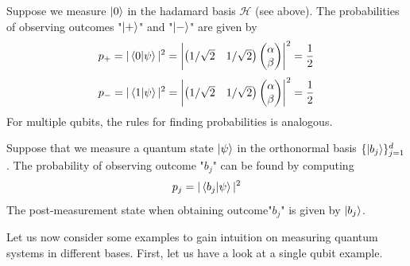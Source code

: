 \begin{example}
    Suppose we measure $\ket{0}$ in the hadamard basis $\mathcal{H}$ (see above). The probabilities of observing outcomes "$\ket{+}$" and "$\ket{-}$" are given by
    \[
    p_+=|\braket{0|\psi}|^2=\begin{vmatrix}\begin{pmatrix} 1/\sqrt{2} & 1/\sqrt{2} \end{pmatrix} \begin{pmatrix}\alpha \\ \beta \end{pmatrix}  \end{vmatrix}^2=\frac{1}{2}
\]
\[
p_-=|\braket{1|\psi}|^2=\begin{vmatrix} \begin{pmatrix} 1/\sqrt{2} & 1/\sqrt{2} \end{pmatrix}\begin{pmatrix}\alpha \\ \beta \end{pmatrix}  \end{vmatrix}^2=\frac{1}{2}
\]
For multiple qubits, the rules for finding probabilities is analogous.
\end{example}

\begin{definition}
    Suppose that we measure a quantum state $\ket{\psi}$ in the orthonormal basis $\{\ket{b_j}\}_{j=1}^d$. The probability of observing outcome "$b_j$" can be found by computing
    \[
    p_j=|\braket{b_j|\psi}|^2
    \]
    The post-measurement state when obtaining outcome"$b_j$" is given by $\ket{b_j}$.
\end{definition}

Let us now consider some examples to gain intuition on measuring quantum systems in different
bases. First, let us have a look at a single qubit example.

